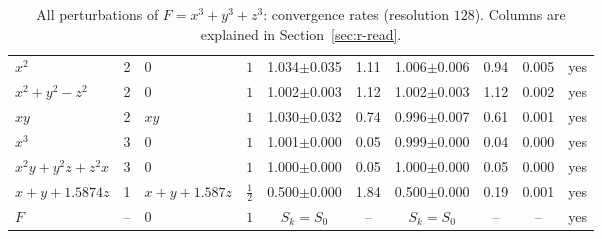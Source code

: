 \documentclass[12pt, a4paper]{article}
\theoremstyle{plain}
\theoremstyle{definition}
\theoremstyle{remark}
\theoremstyle{definition}
\begin{document}
\begin{table}[!h]
\begin{adjustbox}{max width=\textwidth}
\begin{tabular}{l c l c c c c c c c}
$x^2$ & 2 & $0$ & $1$ & 1.034{\scriptsize$\pm$0.035} & 1.11 & 1.006{\scriptsize$\pm$0.006} & 0.94 & 0.005 & yes \\
$x^2+y^2-z^2$ & 2 & $0$ & $1$ & 1.002{\scriptsize$\pm$0.003} & 1.12 & 1.002{\scriptsize$\pm$0.003} & 1.12 & 0.002 & yes \\
$xy$ & 2 & $xy$ & $1$ & 1.030{\scriptsize$\pm$0.032} & 0.74 & 0.996{\scriptsize$\pm$0.007} & 0.61 & 0.001 & yes \\
$x^3$ & 3 & $0$ & $1$ & 1.001{\scriptsize$\pm$0.000} & 0.05 & 0.999{\scriptsize$\pm$0.000} & 0.04 & 0.000 & yes \\
$x^2y+y^2z+z^2x$ & 3 & $0$ & $1$ & 1.000{\scriptsize$\pm$0.000} & 0.05 & 1.000{\scriptsize$\pm$0.000} & 0.05 & 0.000 & yes \\
$x+y+1.5874z$ & 1 & $x + y + 1.587z$ & $\tfrac12$ & 0.500{\scriptsize$\pm$0.000} & 1.84 & 0.500{\scriptsize$\pm$0.000} & 0.19 & 0.001 & yes \\
$F$ & -- & $0$ & $1$ & $S_k=S_0$ & -- & $S_k=S_0$ & -- & -- & yes \\
\bottomrule
\end{tabular}
\end{adjustbox}
\caption[Rates for $x^3+y^3+z^3$]{All perturbations of $F=x^3+y^3+z^3$: convergence rates (resolution $128$). Columns are explained in Section~\ref{sec:r-read}.}
\label{tab:r-E6a-rates}
\end{table}
\end{document}
